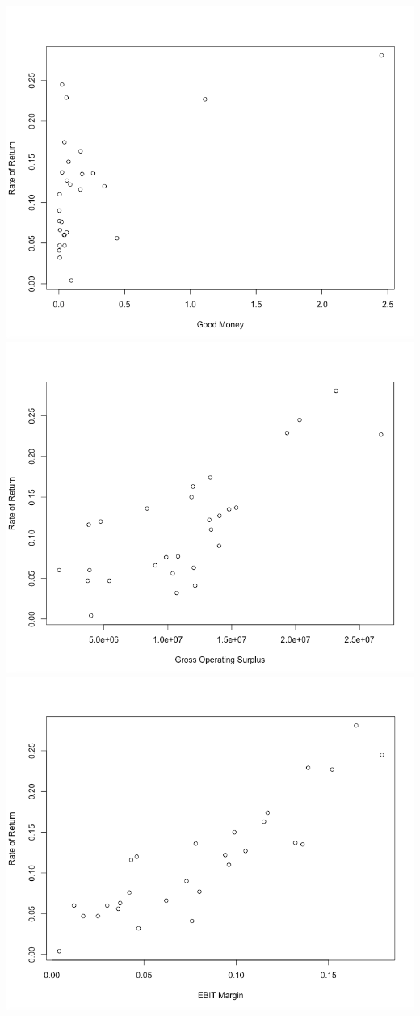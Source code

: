 \documentclass[12pt,letterpaper]{article}
\begin{document}
\begin{center}
\includegraphics[scale=0.3]{pic1.png}
\includegraphics[scale=0.3]{pic2.png}
\includegraphics[scale=0.3]{pic3.png}
\end{center}
\end{document}
